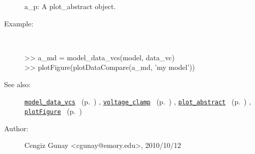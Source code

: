 \begin{description}
   a\_p: A plot\_abstract object.
%
\item[Example:]~
\begin{lyxcode} >> a\_md = model\_data\_vcs(model, data\_vc)
\\%
 >> plotFigure(plotDataCompare(a\_md, 'my model'))
\\%
\end{lyxcode}
%
\item[See also:]%
\hyperlink{ref_model_data_vcs}{\texttt{model\_data\_vcs}}%
\ (p.~\pageref{ref_model_data_vcs})%
%
, \hyperlink{ref_voltage_clamp}{\texttt{voltage\_clamp}}%
\ (p.~\pageref{ref_voltage_clamp})%
%
, \hyperlink{ref_plot_abstract}{\texttt{plot\_abstract}}%
\ (p.~\pageref{ref_plot_abstract})%
%
, \hyperlink{ref_plotFigure}{\texttt{plotFigure}}%
\ (p.~\pageref{ref_plotFigure})%
%
%
\item[Author:]%
Cengiz Gunay <cgunay@emory.edu>, 2010/10/12
%
\end{description}
\methodline%
